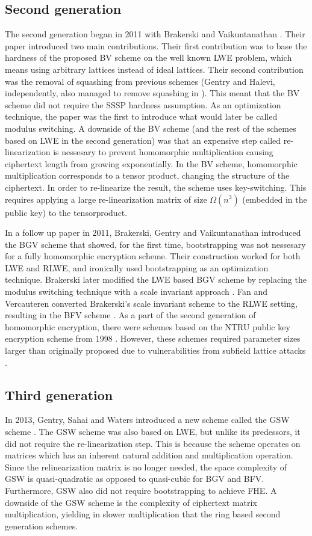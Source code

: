 \subsection*{Second generation}
The second generation began in 2011 with Brakerski and Vaikuntanathan \cite{BV11}. Their paper introduced two main contributions. Their first contribution was to base the hardness of the proposed BV scheme on the well known LWE problem, which means using arbitrary lattices instead of ideal lattices. Their second contribution was the removal of squashing from previous schemes (Gentry and Halevi, independently, also managed to remove squashing in \cite{Gen-Hal-no-squash}). This meant that the BV scheme did not require the SSSP hardness assumption. As an optimization technique, the paper was the first to introduce what would later be called modulus switching. A downside of the BV scheme (and the rest of the schemes based on LWE in the second generation) was that an expensive step called re-linearization is nessesary to prevent homomorphic multiplication causing ciphertext length from growing exponentially. In the BV scheme, homomorphic multiplication corresponds to a tensor product, changing the structure of the ciphertext. In order to re-linearize the result, the scheme uses key-switching. This requires applying a large re-linearization matrix of size $\Omega(n^3)$ (embedded in the public key) to the tensorproduct.

In a follow up paper in 2011, Brakerski, Gentry and Vaikuntanathan introduced the BGV scheme that showed, for the first time, bootstrapping was not nessesary for a fully homomorphic encryption scheme. Their construction worked for both LWE and RLWE, and ironically used bootstrapping as an optimization technique. Brakerski later modified the LWE based BGV scheme by replacing the modulus switching technique with a scale invariant approach \cite{Bra12-BFV} . Fan and Vercauteren converted Brakerski's scale invariant scheme to the RLWE setting, resulting in the BFV scheme \cite{FV12-BFV}. As a part of the second generation of homomorphic encryption, there were schemes based on the NTRU public key encryption scheme from 1998 \cite{NTRU}. However, these schemes required parameter sizes larger than originally proposed due to vulnerabilities from subfield lattice attacks \cite{NTRU-attack}.

\subsection*{Third generation}
In 2013, Gentry, Sahai and Waters introduced a new scheme called the GSW scheme \cite{GSW13}. The GSW scheme was also based on LWE, but unlike its predessors, it did not require the re-linearization step. This is because the scheme operates on matrices which has an inherent natural addition and multiplication operation. Since the relinearization matrix is no longer needed, the space complexity of GSW is quasi-quadratic as opposed to quasi-cubic for BGV and BFV. Furthermore, GSW also did not require bootstrapping to achieve FHE. A downside of the GSW scheme is the complexity of ciphertext matrix multiplication, yielding in slower multiplication that the ring based second generation schemes.

